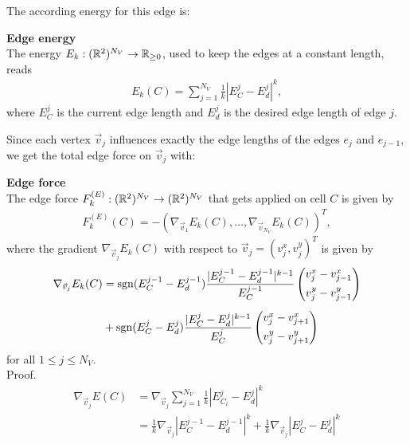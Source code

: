 The according energy for this edge is:
\begin{definition} \textbf{Edge energy} \\
	The energy $E_k: (\mathbb{R}^2)^{N_V} \rightarrow \mathbb{R}_{\geq 0}$, used to keep the edges at a constant length, reads 
	\begin{align}
		E_k(C) =  \sum\limits_{j=1}^{N_V} \frac{1}{k} |E^j_{C} - E^{j}_d|^k, \label{eq:edgeEnergy} 
	\end{align}
	where $E^j_{C}$ is the current edge length and $E^{j}_d$ is the desired edge length of edge $j$. 
\end{definition}

Since each vertex $\vec{v}_j$ influences exactly the edge lengths of the edges $e_{j}$ and $e_{j-1}$, we get the total edge force on $\vec{v}_j$ with: 

\begin{proposition} \textbf{Edge force} \\

	The edge force $F_{k}^{(E)}: (\mathbb{R}^2)^{N_V} \rightarrow (\mathbb{R}^2)^{N_V}$ that gets applied on cell $C$ is given by  
	\begin{align*}
		F_{k}^{(E)}(C) 
		= - (\nabla_{\vec{v}_1} E_k(C), \ldots, \nabla_{\vec{v}_{N_V}} E_k(C))^T,
	\end{align*}
	where the gradient $\nabla_{\vec{v}_j} E_k(C)$ with respect to $\vec{v}_j = (v_{j}^{x}, v_{j}^{y})^T$ is given by 
	\begin{align}
		\begin{split}
			\nabla_{\vec{v}_j} E_k(C) &= \operatorname{sgn}(E^{j-1}_{C}- E_d^{j-1}) \dfrac{|E^{j-1}_{C}- E_d^{j-1}|^{k-1}}{E^{j-1}_{C}}  
			\begin{pmatrix} v_{j}^{x} - v_{j-1}^{x} \\[0.5em]  v_{j}^{y} - v_{j-1}^{y}  \end{pmatrix} \\[0.5em]
			&+ \operatorname{sgn}(E^j_{C} - E_d^{j}) \dfrac{|E^j_{C} - E_d^{j}|^{k-1}}{E^j_{C}}  
			\begin{pmatrix} v_{j}^{x} - v_{j+1}^{x} \\[0.5em]  v_{j}^{y} - v_{j+1}^{y} \end{pmatrix}
		\end{split}
		\label{gradient:edge}
	\end{align}
	for all $1 \leq j \leq N_V$.\\

	Proof. \\

	\begin{align*}
		\nabla_{\vec{v}_{j}} E(C) &= \nabla_{\vec{v}_{j}} \sum\limits_{j=1}^{N_V} \frac{1}{k} |E^j_{C_i} - E^{j}_d|^k \\
		&= \frac{1}{k} \nabla_{\vec{v}_{j}} |E^{j-1}_{C} - E^{j-1}_d|^k + \frac{1}{k}\nabla_{\vec{v}_{j}} |E^j_{C} - E^{j}_d|^k 
	\end{align*}


\end{proposition}
